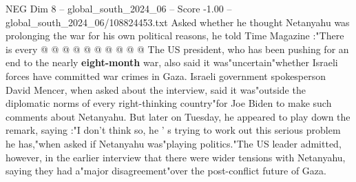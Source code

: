 \begin{textsample}{NEG Dim 8 – global\_south\_2024\_06 – Score -1.00 – global\_south\_2024\_06/108824453.txt}
Asked whether he thought Netanyahu was prolonging the war for his own political reasons, he told Time Magazine :"There is every @ @ @ @ @ @ @ @ @ @ The US president, who has been pushing for an end to the nearly \textbf{eight-month} war, also said it was"uncertain"whether Israeli forces have committed war crimes in Gaza.
Israeli government spokesperson David Mencer, when asked about the interview, said it was"outside the diplomatic norms of every right-thinking country"for Joe Biden to make such comments about Netanyahu.
But later on Tuesday, he appeared to play down the remark, saying :"I don't think so, he ' s trying to work out this serious problem he has,"when asked if Netanyahu was"playing politics."The US leader admitted, however, in the earlier interview that there were wider tensions with Netanyahu, saying they had a"major disagreement"over the post-conflict future of Gaza.

\end{textsample}
